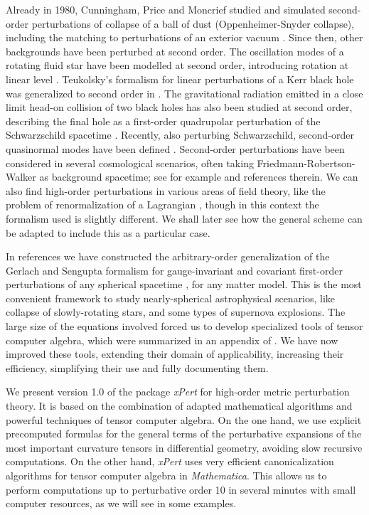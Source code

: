 \documentclass[aps,prd,showpacs]{revtex4}
\newcommand{\xPert}{{\em \lowercase{x}P\lowercase{ert}}}
\begin{document}
Already in 1980, Cunningham, Price and Moncrief studied and simulated
second-order perturbations of collapse of a ball of dust 
(Oppenheimer-Snyder collapse), including the matching to perturbations of an
exterior vacuum \cite{CPM80}. Since then, other backgrounds have been
perturbed at second order. The oscillation modes of a rotating fluid
star have been modelled at second order, introducing rotation at linear
level \cite{CF91, Koj92}.
Teukolsky's formalism \cite{Teu72} for linear perturbations of a
Kerr black hole was generalized to second order in \cite{CaLo99}.
The gravitational radiation emitted in a close limit head-on collision
of two black holes has also been studied at second order, describing
the final hole as a first-order quadrupolar perturbation of the
Schwarzschild spacetime \cite{PrPu94, GNP96}. Recently, also perturbing
Schwarzschild, second-order quasinormal modes have been
defined \cite{IoNa07, NaIo07}. Second-order perturbations
have been considered in several cosmological scenarios, often
taking Friedmann-Robertson-Walker as background spacetime;
see for example \cite{MPS94, SSC94, BMT02} and
references therein. We can also find high-order perturbations in
various areas of field theory, like the problem of
renormalization of a Lagrangian \cite{BFT}, though in this context the
formalism used is slightly different. We shall later see how the general
scheme can be adapted to include this as a particular case.

In references \cite{BMM06, BMM07} we have constructed the arbitrary-order
generalization of the Gerlach and Sengupta formalism for gauge-invariant
and covariant first-order perturbations of any spherical spacetime
\cite{GeSe79}, for any matter model. This is the most convenient framework to study
nearly-spherical astrophysical scenarios, like collapse of slowly-rotating
stars, and some types of supernova explosions. The large size of the
equations involved forced us to develop specialized tools of tensor
computer algebra, which were summarized in an appendix of \cite{BMM06}.
We have now improved these tools, extending their domain of applicability,
increasing their efficiency, simplifying their use and fully documenting
them.

We present version 1.0 of the package \xPert\/ for high-order metric
perturbation theory. It is based on the combination of adapted
mathematical algorithms and powerful techniques of tensor computer
algebra. On the one hand, we use explicit precomputed formulas for the
general terms of the perturbative expansions of the most important
curvature tensors in differential geometry, avoiding slow recursive
computations. On the other hand, \xPert\/ uses very efficient
canonicalization algorithms for tensor computer algebra in
{\em Mathematica}. This allows us to perform computations up to
perturbative order 10 in several minutes with small computer resources,
as we will see in some examples.
\end{document}
